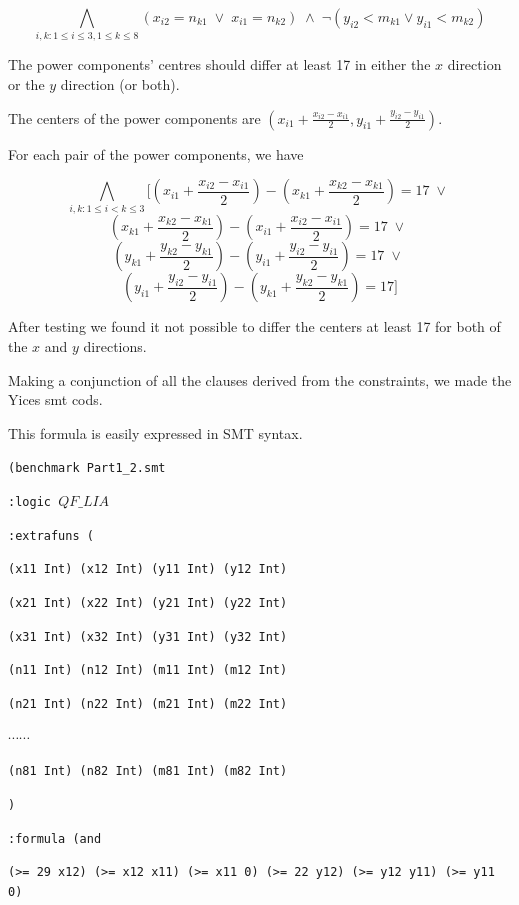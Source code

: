 \documentclass[11pt]{article}
\begin{document}
{\begin{description}
  \[  \bigwedge_{i,k: 1 \leq i \leq 3, 1 \leq k \leq 8}
  (x_{i2} = n_{k1} \; \vee \; x_{i1} = n_{k2}) \; \wedge \;
  \neg (y_{i2} < m_{k1} \vee y_{i1} < m_{k2}) \]
  \item[Constraint 5:] The power components' centres should differ at least 17 in either the $x$ direction or the $y$ direction (or both).

  The centers of the power components are $(x_{i1} + \frac{x_{i2} - x_{i1}}{2}, y_{i1} + \frac{y_{i2} - y_{i1}}{2} )$.

  For each pair of the power components, we have

  \[  \bigwedge_{i,k: 1 \leq i < k \leq 3}
  [ (x_{i1} + \frac{x_{i2} - x_{i1}}{2}) - (x_{k1} + \frac{x_{k2} - x_{k1}}{2}) = 17 \; \vee \; \]
  \[ (x_{k1} + \frac{x_{k2} - x_{k1}}{2}) - (x_{i1} + \frac{x_{i2} - x_{i1}}{2}) = 17 \; \vee \; \]
  \[ (y_{k1} + \frac{y_{k2} - y_{k1}}{2}) - (y_{i1} + \frac{y_{i2} - y_{i1}}{2}) = 17 \; \vee \; \]
  \[ (y_{i1} + \frac{y_{i2} - y_{i1}}{2}) - (y_{k1} + \frac{y_{k2} - y_{k1}}{2}) = 17 ] \]

  After testing we found it not possible to differ the centers at least 17 for both of the $x$ and $y$ directions.
\end{description}

Making a conjunction of all the clauses derived from the constraints, we made the Yices smt cods.

This formula is easily expressed in SMT syntax.

{\footnotesize

{\tt (benchmark Part1\_2.smt}

{\tt :logic $QF\_LIA$}

{\tt :extrafuns (}

{\tt (x11 Int) (x12 Int) (y11 Int) (y12 Int)}

{\tt (x21 Int) (x22 Int) (y21 Int) (y22 Int)}

{\tt (x31 Int) (x32 Int) (y31 Int) (y32 Int)}

{\tt (n11 Int) (n12 Int) (m11 Int) (m12 Int)}

{\tt (n21 Int) (n22 Int) (m21 Int) (m22 Int)}

$\cdots \cdots$

{\tt (n81 Int) (n82 Int) (m81 Int) (m82 Int)}

{\tt )}

{\tt :formula (and}

{\tt (>= 29 x12) (>= x12 x11) (>= x11 0) (>= 22 y12) (>= y12 y11) (>= y11 0)}

}}
\end{document}
